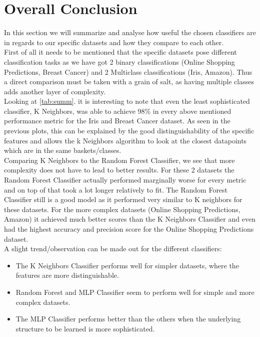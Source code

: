 \documentclass{article}
\newcommand{\secref}[1]{\autoref{#1}. \textit{\nameref{#1}}}
\begin{document}
\section{Overall Conclusion}
In this section we will summarize and analyse how useful the chosen classifiers are in regards to our specific datasets and how they compare to each other. \\
\newline
First of all it needs to be mentioned that the specific datasets pose different classification tasks as we have got 2 binary classifications (Online Shopping Predictions, Breast Cancer) and 2 Multiclass classifications (Iris, Amazon). Thus a direct comparison must be taken with a grain of salt, as having multiple classes adds another layer of complexity. \\
\newline
Looking at \secref{tab:summ} it is interesting to note that even the least sophisticated classifier, K Neighbors, was able to achieve 98\% in every above mentioned performance metric for the Iris and Breast Cancer dataset. As seen in the previous plots, this can be explained by the good distinguishability of the specific features and allows the k Neighbors algorithm to look at the closest datapoints which are in the same baskets/classes. \\
Comparing K Neighbors  to the Random Forest Classifier, we see that more complexity does not have to lead to better results. For these 2 datasets the Random Forest Classifier actually performed marginally worse for every metric and on top of that took a lot longer relatively to fit. The Random Forest Classifier still is a good model as it performed very similar to K neighbors for these datasets. For the more complex datasets (Online Shopping Predictions, Amazon) it achieved much better scores than the K Neighbors Classifier and even had the highest accuracy and precision score for the Online Shopping Predictions dataset. \\
\newline
A slight trend/observation can be made out for the different classifiers: 
\begin{itemize}
    \item The K Neighbors Classifier performs well for simpler datasets, where the features are more distinguishable.
    \item Random Forest and MLP Classifier seem to perform well for simple and more complex datasets.
    \item The MLP Classifier performs better than the others when the underlying structure to be learned is more sophisticated.
\end{itemize} 
\end{document}
